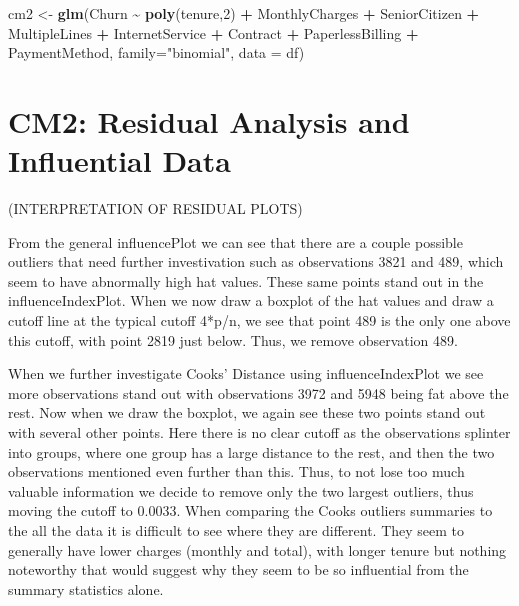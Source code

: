 \documentclass[
]{article}
\newenvironment{Shaded}{\begin{snugshade}}{\end{snugshade}}
\newcommand{\AttributeTok}[1]{\textcolor[rgb]{0.13,0.29,0.53}{#1}}
\newcommand{\DecValTok}[1]{\textcolor[rgb]{0.00,0.00,0.81}{#1}}
\newcommand{\FunctionTok}[1]{\textcolor[rgb]{0.13,0.29,0.53}{\textbf{#1}}}
\newcommand{\NormalTok}[1]{#1}
\newcommand{\OtherTok}[1]{\textcolor[rgb]{0.56,0.35,0.01}{#1}}
\newcommand{\SpecialCharTok}[1]{\textcolor[rgb]{0.81,0.36,0.00}{\textbf{#1}}}
\newcommand{\StringTok}[1]{\textcolor[rgb]{0.31,0.60,0.02}{#1}}
\begin{document}
\begin{Shaded}
\begin{Highlighting}[]
\NormalTok{cm2 }\OtherTok{\textless{}{-}} \FunctionTok{glm}\NormalTok{(Churn }\SpecialCharTok{\textasciitilde{}} \FunctionTok{poly}\NormalTok{(tenure,}\DecValTok{2}\NormalTok{) }\SpecialCharTok{+}\NormalTok{ MonthlyCharges }\SpecialCharTok{+}\NormalTok{ SeniorCitizen }\SpecialCharTok{+}\NormalTok{ MultipleLines }\SpecialCharTok{+}\NormalTok{ InternetService }\SpecialCharTok{+}\NormalTok{ Contract }\SpecialCharTok{+}\NormalTok{ PaperlessBilling }\SpecialCharTok{+}\NormalTok{ PaymentMethod, }\AttributeTok{family=}\StringTok{"binomial"}\NormalTok{, }\AttributeTok{data =}\NormalTok{ df)}
\end{Highlighting}
\end{Shaded}

\hypertarget{cm2-residual-analysis-and-influential-data}{%
\section{CM2: Residual Analysis and Influential
Data}\label{cm2-residual-analysis-and-influential-data}}

(INTERPRETATION OF RESIDUAL PLOTS)

From the general influencePlot we can see that there are a couple
possible outliers that need further investivation such as observations
3821 and 489, which seem to have abnormally high hat values. These same
points stand out in the influenceIndexPlot. When we now draw a boxplot
of the hat values and draw a cutoff line at the typical cutoff 4*p/n, we
see that point 489 is the only one above this cutoff, with point 2819
just below. Thus, we remove observation 489.

When we further investigate Cooks' Distance using influenceIndexPlot we
see more observations stand out with observations 3972 and 5948 being
fat above the rest. Now when we draw the boxplot, we again see these two
points stand out with several other points. Here there is no clear
cutoff as the observations splinter into groups, where one group has a
large distance to the rest, and then the two observations mentioned even
further than this. Thus, to not lose too much valuable information we
decide to remove only the two largest outliers, thus moving the cutoff
to 0.0033. When comparing the Cooks outliers summaries to the all the
data it is difficult to see where they are different. They seem to
generally have lower charges (monthly and total), with longer tenure but
nothing noteworthy that would suggest why they seem to be so influential
from the summary statistics alone.
\end{document}
